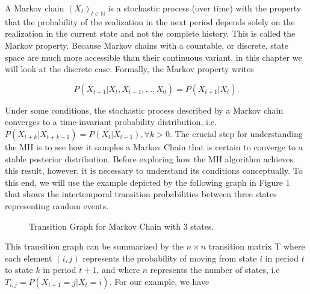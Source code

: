 \documentclass[12pt,english,a4paper,oneside]{article}
\theoremstyle{definition}
\theoremstyle{definition}
\theoremstyle{definition}
\theoremstyle{definition}
\theoremstyle{remark}
\begin{document}
A Markov chain \((X_t)_{t \in \mathbb{N}}\) is a stochastic process (over time) with the property that the probability of the realization in the next period depends solely on the realization in the current state and not the complete history. This is called the Markov property. Because Markov chains with a countable, or discrete, state space are much more accessible than their continuous variant, in this chapter we will look at the discrete case. Formally, the Markov property writes

\begin{equation}
\label{eq:markov-property}
P(X_{t+1} |X_{t}, X_{t-1}, ..., X_{0}) = P(X_{t+1} |X_{t}).
\end{equation}

\noindent
Under some conditions, the stochastic process described by a Markov chain converges to a time-invariant probability distribution, i.e.~\(P(X_{t+k} |X_{t+k-1}) = P(X_{t} |X_{t-1}), \forall k>0\). The crucial step for understanding the MH is to see how it samples a Markov Chain that is certain to converge to a stable posterior distribution. Before exploring how the MH algorithm achieves this result, however, it is necessary to understand its conditions conceptually. To this end, we will use the example depicted by the following graph in Figure 1 that shows the intertemporal transition probabilities between three states representing random events.

\begin{figure}[H]
\label{fig:ex1}


\centering


\caption{Transition Graph for Markov Chain with 3 states.}
\end{figure}

\noindent
This transition graph can be summarized by the \(n \times n\) transition matrix T where each element \((i,j)\) represents the probability of moving from state \(i\) in period \(t\) to state \(k\) in period \(t+1\), and where \(n\) represents the number of states, i.e \(T_{i,j} = P(X_{t+1}=j | X_t = i)\). For our example, we have
\end{document}
